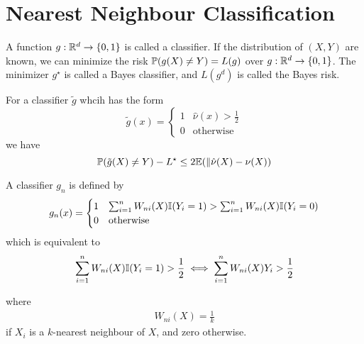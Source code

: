 \section{Nearest Neighbour Classification}
\label{sec:near-neighb-class}

\begin{defn}
  \label{sec:near-neighb-class-1}
  A function $g: \mathbb{R}^{d} \rightarrow \{ 0, 1 \}$ is called a
  classifier. If the distribution of $(X, Y)$ are known, we can
  minimize the risk $\Prob{g(X) \neq Y} = L(g)$ over $g: \mathbb{R}^{d}
  \rightarrow \{ 0, 1 \}$. The minimizer $g^{\star}$ is called a Bayes
  classifier, and $L(g^{d})$ is called the Bayes risk.
\end{defn}

\begin{lem}
  For a classifier $\tilde g$ whcih has the form
  \begin{equation}
    \label{eq:90}
    \tilde g(x) =
    \begin{cases}
      1 & \hat \nu(x) > \frac{1}{2} \\
      0 & \text{otherwise}
    \end{cases}
  \end{equation} we have
  \begin{equation}
    \label{eq:93}
    \Prob{\tilde g(X) \neq Y} - L^{\star} \leq 2 \E{\| \hat \nu(X) - \nu(X)}
  \end{equation}
\end{lem}

\begin{defn}
  \label{defn:nearest_neighbour_classification:1}
  A \knn classifier $g_{n}$ is defined by
  \begin{align}
    \label{eq:94}
    g_{n}(x) =
    \begin{cases}
      1 & \sum_{i=1}^{n} W_{ni}(X) \I{Y_{i} = 1} > \sum_{i=1}^{n}
      W_{ni}(X) \I{Y_{i} = 0} \\
      0 & \text{otherwise}
    \end{cases}
  \end{align}
  which is equivalent to
  \begin{align}
    \label{eq:96}
    \sum_{i=1}^{n} W_{ni}(X) \I{Y_{i} = 1} > \frac{1}{2} \iff
    \sum_{i=1}^{n} W_{ni}(X) Y_{i} > \frac{1}{2}
  \end{align}
  
  where
  \begin{align}
    \label{eq:95}
    W_{ni}(X) = \frac{1}{k} 
  \end{align} if $X_{i}$ is a $k$-nearest neighbour of $X$, and zero otherwise.
\end{defn}

